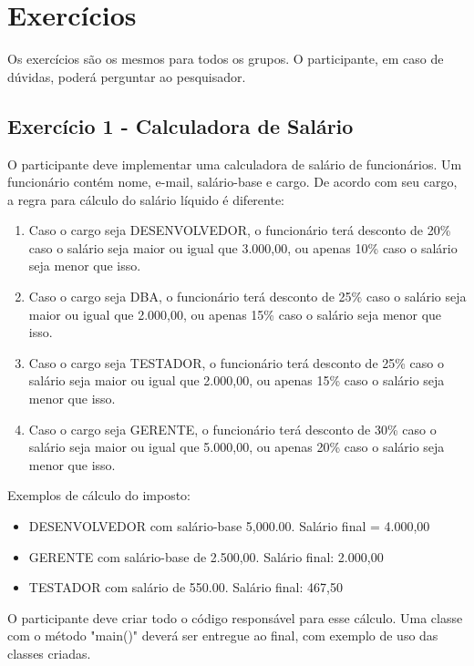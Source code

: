 \chapter{Exercícios}
\label{ape:exercicios}

Os exercícios são os mesmos para todos os grupos. O participante, em caso de dúvidas, poderá perguntar ao pesquisador.

\section{Exercício 1 - Calculadora de Salário}

O participante deve implementar uma calculadora de salário de funcionários. Um
funcionário contém nome, e-mail, salário-base e cargo. De acordo com seu cargo,
a regra para cálculo do salário líquido é diferente:

\begin{enumerate}
	\item Caso o cargo seja DESENVOLVEDOR, o funcionário terá desconto de 20\%
	caso o salário seja maior ou igual que 3.000,00, ou apenas 10\% caso o salário seja menor 
	que isso.
	
	\item Caso o cargo seja DBA, o funcionário terá desconto de 25\%
	caso o salário seja maior ou igual que 2.000,00, ou apenas 15\% caso o salário seja menor 
	que isso.

	\item Caso o cargo seja TESTADOR, o funcionário terá desconto de 25\%
	caso o salário seja maior ou igual que 2.000,00, ou apenas 15\% caso o salário seja menor 
	que isso.
	
	\item Caso o cargo seja GERENTE, o funcionário terá desconto de 30\%
	caso o salário seja maior ou igual que 5.000,00, ou apenas 20\% caso o salário seja menor 
	que isso.
\end{enumerate}

Exemplos de cálculo do imposto:

\begin{itemize}
	\item DESENVOLVEDOR com salário-base 5,000.00. Salário final = 4.000,00
	\item GERENTE com salário-base de 2.500,00. Salário final: 2.000,00
	\item TESTADOR com salário de 550.00. Salário final: 467,50
\end{itemize}


O participante deve criar todo o código responsável para esse cálculo. Uma classe com
o método "main()" deverá ser entregue ao final, com exemplo de uso das classes criadas.

